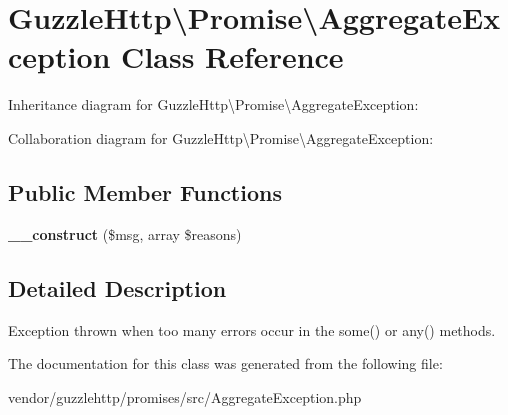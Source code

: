 \hypertarget{classGuzzleHttp_1_1Promise_1_1AggregateException}{}\section{Guzzle\+Http\textbackslash{}Promise\textbackslash{}Aggregate\+Exception Class Reference}
\label{classGuzzleHttp_1_1Promise_1_1AggregateException}


Inheritance diagram for Guzzle\+Http\textbackslash{}Promise\textbackslash{}Aggregate\+Exception\+:


Collaboration diagram for Guzzle\+Http\textbackslash{}Promise\textbackslash{}Aggregate\+Exception\+:
\subsection*{Public Member Functions}
\begin{DoxyCompactItemize}
\item 
\mbox{\label{classGuzzleHttp_1_1Promise_1_1AggregateException_a847ee670e6d3a74e796913ded505e9fa}} 
{\bfseries \+\_\+\+\_\+construct} (\$msg, array \$reasons)
\end{DoxyCompactItemize}


\subsection{Detailed Description}
Exception thrown when too many errors occur in the some() or any() methods. 

The documentation for this class was generated from the following file\+:\begin{DoxyCompactItemize}
\item 
vendor/guzzlehttp/promises/src/Aggregate\+Exception.\+php\end{DoxyCompactItemize}
